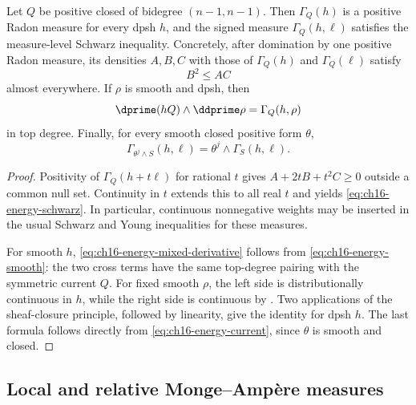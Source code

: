 \begin{lemma}
\label{lem:ch16-energy-schwarz}
Let $Q$ be positive closed of bidegree $(n-1,n-1)$.  Then
$\Gamma_Q(h)$ is a positive Radon measure for every dpsh $h$, and the signed
measure $\Gamma_Q(h,\ell)$ satisfies the measure-level Schwarz inequality.
Concretely, after domination by one positive Radon measure, its densities
$A,B,C$ with those of $\Gamma_Q(h)$ and $\Gamma_Q(\ell)$ satisfy
\begin{equation}
\label{eq:ch16-energy-schwarz}
                         B^2\leq AC
\end{equation}
almost everywhere.  If $\rho$ is smooth and dpsh, then
\begin{equation}
\label{eq:ch16-energy-mixed-derivative}
             \dprime(hQ)\wedge\ddprime\rho
                         =\Gamma_Q(h,\rho)
\end{equation}
in top degree.  Finally, for every smooth closed positive form $\theta$,
\begin{equation}
\label{eq:ch16-energy-closed-factor}
 \Gamma_{\theta^j\wedge S}(h,\ell)
                         =\theta^j\wedge\Gamma_S(h,\ell).
\end{equation}
\end{lemma}

\begin{proof}
Positivity of $\Gamma_Q(h+t\ell)$ for rational $t$ gives
$A+2tB+t^2C\geq0$ outside a common null set.  Continuity in $t$ extends this
to all real $t$ and yields \eqref{eq:ch16-energy-schwarz}.  In particular,
continuous nonnegative weights may be inserted in the usual Schwarz and
Young inequalities for these measures.

For smooth $h$, \eqref{eq:ch16-energy-mixed-derivative} follows from
\eqref{eq:ch16-energy-smooth}: the two cross terms have the same top-degree
pairing with the symmetric current $Q$.  For fixed smooth $\rho$, the left
side is distributionally continuous in $h$, while the right side is
continuous by .  Two applications of the
sheaf-closure principle, followed by linearity, give the identity for dpsh
$h$.  The last formula follows directly from
\eqref{eq:ch16-energy-current}, since $\theta$ is smooth and closed.
\end{proof}

\subsection{Local and relative Monge--Amp\`ere measures}
\label{sec:ch16-ma-measures}

